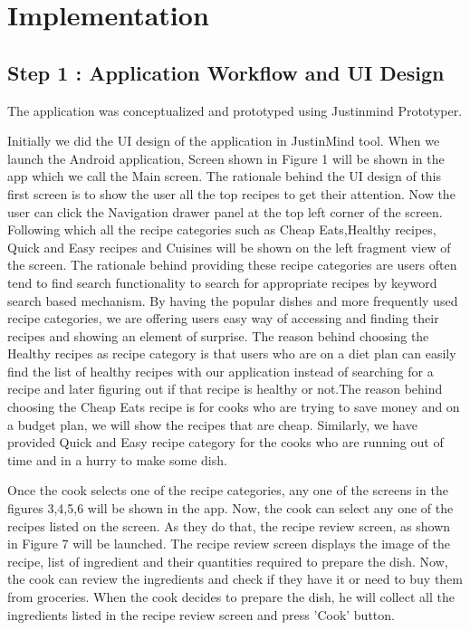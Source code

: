 \section{Implementation} 

\subsection{Step 1 : Application Workflow and UI Design}
	
The application was conceptualized and prototyped using Justinmind Prototyper. 

Initially we did the UI design of the application in JustinMind tool. 
When we launch the Android application, Screen shown in Figure 1 will be shown in the app which we call the Main screen. The rationale behind the UI design of this first screen is to show the user all the top recipes to get their attention. 
Now the user can click the Navigation drawer panel at the top left corner of the screen.
Following which all the recipe categories such as Cheap Eats,Healthy recipes, Quick and Easy recipes and Cuisines will be shown on the left fragment view of the screen. 
The rationale behind providing these recipe categories are users often tend to find search functionality to search for appropriate recipes by keyword search based mechanism. 
By having the popular dishes and more frequently used recipe categories, we are offering users easy way of accessing and finding their recipes and showing an element of surprise.
The reason behind choosing the Healthy recipes as recipe category is that users who are on a diet plan can easily find the list of healthy recipes with our application instead of searching for a recipe and later figuring out if that recipe is healthy or not.The reason behind choosing the Cheap Eats recipe is for cooks who are trying to save money and on a budget plan, we will show the recipes that are cheap. 
Similarly, we have provided Quick and Easy recipe category for the cooks who are running out of time and in a hurry to make some dish. 

Once the cook selects one of the recipe categories, any one of the screens in the figures 3,4,5,6 will be shown in the app. 
Now, the cook can select any one of the recipes listed on the screen. As they do that, the recipe review screen, as shown in Figure 7 will be launched. The recipe review screen displays the image of the recipe, list of ingredient and their quantities required to prepare the dish. Now, the cook can review the ingredients and check if they have it or need to buy them from groceries. When the cook decides to prepare the dish, he will collect all the ingredients listed in the recipe review screen and press 'Cook' button.

